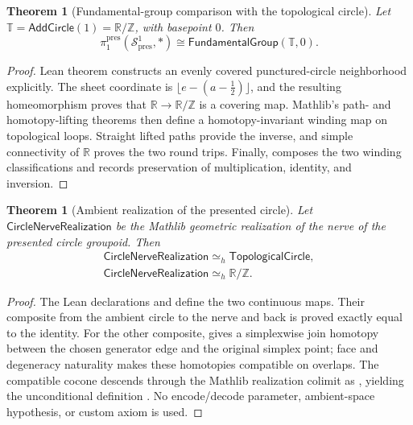 \documentclass{lmcs}
\theoremstyle{definition}
\theoremstyle{plain}
\newtheorem{theorem}[definition]{Theorem}
\theoremstyle{remark}
\newcommand{\piOne}{\pi_1}
\begin{document}
\begin{theorem}[Fundamental-group comparison with the topological circle]
\label{thm:circle-realization}
Let \(\mathbb T=\mathsf{AddCircle}(1)=\mathbb R/\mathbb Z\), with basepoint
\(0\).  Then
\[
\piOne^{\mathrm{pres}}(\mathcal S^1_{\mathrm{pres}},*)
\cong \mathsf{FundamentalGroup}(\mathbb T,0).
\]
\end{theorem}

\begin{proof}
Lean theorem  constructs an evenly covered
punctured-circle neighborhood explicitly.  The sheet coordinate is
\(\lfloor e-(a-\frac12)\rfloor\), and the resulting homeomorphism proves that
\(\mathbb R\to\mathbb R/\mathbb Z\) is a covering map.  Mathlib's path- and
homotopy-lifting theorems then define a homotopy-invariant winding map on
topological loops.  Straight lifted paths provide the inverse, and simple
connectivity of \(\mathbb R\) proves the two round trips.  Finally,
 composes the two winding
classifications and records preservation of multiplication, identity, and
inversion.
\end{proof}

\begin{theorem}[Ambient realization of the presented circle]
\label{thm:circle-ambient-realization}
Let \(\mathsf{CircleNerveRealization}\) be the Mathlib geometric realization of
the nerve of the presented circle groupoid.  Then
\[
\begin{gathered}
\mathsf{CircleNerveRealization}\simeq_h\mathsf{TopologicalCircle},\\
\mathsf{CircleNerveRealization}\simeq_h\mathbb R/\mathbb Z.
\end{gathered}
\]
\end{theorem}

\begin{proof}
The Lean declarations  and
 define the two continuous maps.  Their composite
from the ambient circle to the nerve and back is proved exactly equal to the
identity.  For the other composite,  gives a
simplexwise join homotopy between the chosen generator edge and the original
simplex point; face and degeneracy naturality makes these homotopies compatible
on overlaps.  The compatible cocone descends through the Mathlib realization
colimit as , yielding the
unconditional definition .
No encode/decode parameter, ambient-space hypothesis, or custom axiom is used.
\end{proof}
\end{document}
